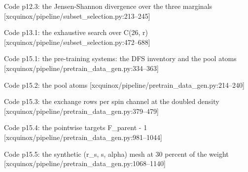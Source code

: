 \begin{frame}[allowframebreaks]{Code p12.3: the Jensen-Shannon divergence over the three marginals [xcquinox/pipeline/subset\_selection.py:213--245]}
\label{code:p12_3_the_jensen_shannon_divergence_over_the_t}
\end{frame}
\begin{frame}[allowframebreaks]{Code p13.1: the exhaustive search over C(26, r) [xcquinox/pipeline/subset\_selection.py:472--688]}
\label{code:p13_1_the_exhaustive_search_over_c_26_r}
\end{frame}
\begin{frame}[allowframebreaks]{Code p15.1: the pre-training systems: the DFS inventory and the pool atoms [xcquinox/pipeline/pretrain\_data\_gen.py:334--363]}
\label{code:p15_1_the_pre_training_systems_the_dfs_invento}
\end{frame}
\begin{frame}[allowframebreaks]{Code p15.2: the pool atoms [xcquinox/pipeline/pretrain\_data\_gen.py:214--240]}
\label{code:p15_2_the_pool_atoms}
\end{frame}
\begin{frame}[allowframebreaks]{Code p15.3: the exchange rows per spin channel at the doubled density [xcquinox/pipeline/pretrain\_data\_gen.py:379--479]}
\label{code:p15_3_the_exchange_rows_per_spin_channel_at_th}
\end{frame}
\begin{frame}[allowframebreaks]{Code p15.4: the pointwise targets F\_parent - 1 [xcquinox/pipeline/pretrain\_data\_gen.py:981--1044]}
\label{code:p15_4_the_pointwise_targets_f_parent_1}
\end{frame}
\begin{frame}[allowframebreaks]{Code p15.5: the synthetic (r\_s, s, alpha) mesh at 30 percent of the weight [xcquinox/pipeline/pretrain\_data\_gen.py:1068--1140]}
\label{code:p15_5_the_synthetic_r_s_s_alpha_mesh_at_30_per}
\end{frame}
